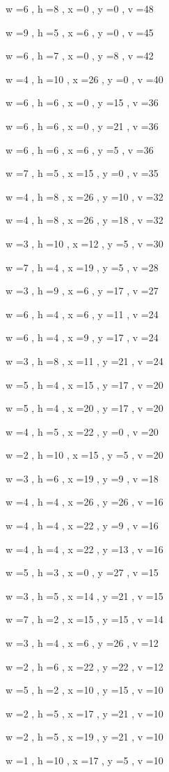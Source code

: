 \documentclass[11pt]{article}
\begin{document}
w =6 , h =8 , x =0 , y =0 , v =48
\par
w =9 , h =5 , x =6 , y =0 , v =45
\par
w =6 , h =7 , x =0 , y =8 , v =42
\par
w =4 , h =10 , x =26 , y =0 , v =40
\par
w =6 , h =6 , x =0 , y =15 , v =36
\par
w =6 , h =6 , x =0 , y =21 , v =36
\par
w =6 , h =6 , x =6 , y =5 , v =36
\par
w =7 , h =5 , x =15 , y =0 , v =35
\par
w =4 , h =8 , x =26 , y =10 , v =32
\par
w =4 , h =8 , x =26 , y =18 , v =32
\par
w =3 , h =10 , x =12 , y =5 , v =30
\par
w =7 , h =4 , x =19 , y =5 , v =28
\par
w =3 , h =9 , x =6 , y =17 , v =27
\par
w =6 , h =4 , x =6 , y =11 , v =24
\par
w =6 , h =4 , x =9 , y =17 , v =24
\par
w =3 , h =8 , x =11 , y =21 , v =24
\par
w =5 , h =4 , x =15 , y =17 , v =20
\par
w =5 , h =4 , x =20 , y =17 , v =20
\par
w =4 , h =5 , x =22 , y =0 , v =20
\par
w =2 , h =10 , x =15 , y =5 , v =20
\par
w =3 , h =6 , x =19 , y =9 , v =18
\par
w =4 , h =4 , x =26 , y =26 , v =16
\par
w =4 , h =4 , x =22 , y =9 , v =16
\par
w =4 , h =4 , x =22 , y =13 , v =16
\par
w =5 , h =3 , x =0 , y =27 , v =15
\par
w =3 , h =5 , x =14 , y =21 , v =15
\par
w =7 , h =2 , x =15 , y =15 , v =14
\par
w =3 , h =4 , x =6 , y =26 , v =12
\par
w =2 , h =6 , x =22 , y =22 , v =12
\par
w =5 , h =2 , x =10 , y =15 , v =10
\par
w =2 , h =5 , x =17 , y =21 , v =10
\par
w =2 , h =5 , x =19 , y =21 , v =10
\par
w =1 , h =10 , x =17 , y =5 , v =10
\end{document}

